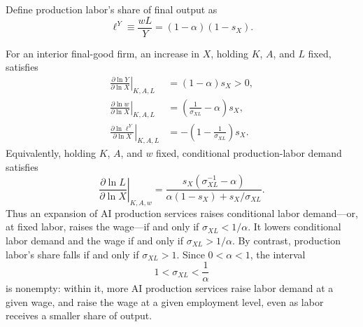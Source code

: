 Define production labor's share of final output as
\begin{equation}
 \ell^Y\equiv\frac{wL}{Y}=(1-\alpha)(1-s_X).
 \label{eq:axm-production-labor-share}
\end{equation}

\begin{proposition}
\label{prop:axm-ai-labor-comparative-static}
For an interior final-good firm, an increase in \(X\), holding \(K\), \(A\),
and \(L\) fixed, satisfies
\begin{align}
 \left.\frac{\partial\ln Y}{\partial\ln X}\right|_{K,A,L}
 &=(1-\alpha)s_X>0,
 \label{eq:axm-output-x-elasticity}\\
 \left.\frac{\partial\ln w}{\partial\ln X}\right|_{K,A,L}
 &=\left(\frac{1}{\sigma_{XL}}-\alpha\right)s_X,
 \label{eq:axm-wage-x-elasticity}\\
 \left.\frac{\partial\ln \ell^Y}{\partial\ln X}\right|_{K,A,L}
 &=-\left(1-\frac{1}{\sigma_{XL}}\right)s_X.
 \label{eq:axm-labor-share-x-elasticity}
\end{align}
Equivalently, holding \(K\), \(A\), and \(w\) fixed, conditional
production-labor demand satisfies
\begin{equation}
 \left.\frac{\partial\ln L}{\partial\ln X}\right|_{K,A,w}
 =\frac{s_X\left(\sigma_{XL}^{-1}-\alpha\right)}
 {\alpha(1-s_X)+s_X/\sigma_{XL}}.
 \label{eq:axm-labor-demand-x-elasticity}
\end{equation}
Thus an expansion of AI production services raises conditional labor demand---or,
at fixed labor, raises the wage---if and only if
\(\sigma_{XL}<1/\alpha\). It lowers conditional labor demand and the wage if and
only if \(\sigma_{XL}>1/\alpha\). By contrast, production labor's share falls if
and only if \(\sigma_{XL}>1\). Since \(0<\alpha<1\), the interval
\begin{equation}
 1<\sigma_{XL}<\frac{1}{\alpha}
 \label{eq:axm-wage-share-decoupling-region}
\end{equation}
is nonempty: within it, more AI production services raise labor demand at a
given wage, and raise the wage at a given employment level, even as labor
receives a smaller share of output.
\end{proposition}


